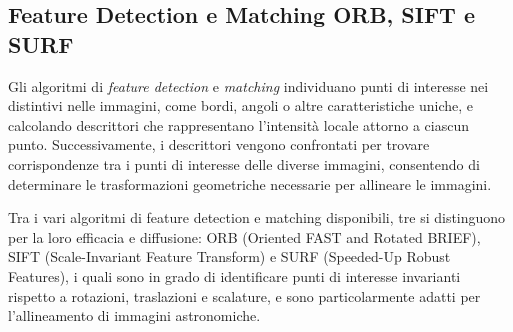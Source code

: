 \subsection{Feature Detection e Matching ORB, SIFT e SURF} \label{subsec:feature_detectoion}

Gli algoritmi di \textit{feature detection} e \textit{matching} individuano punti di interesse nei distintivi nelle immagini, come bordi, angoli o altre caratteristiche uniche, e calcolando descrittori che rappresentano l'intensità locale attorno a ciascun punto. Successivamente, i descrittori vengono confrontati per trovare corrispondenze tra i punti di interesse delle diverse immagini, consentendo di determinare le trasformazioni geometriche necessarie per allineare le immagini.

Tra i vari algoritmi di feature detection e matching disponibili, tre si distinguono per la loro efficacia e diffusione: ORB (Oriented FAST and Rotated BRIEF), SIFT (Scale-Invariant Feature Transform) e SURF (Speeded-Up Robust Features), i quali sono in grado di identificare punti di interesse invarianti rispetto a rotazioni, traslazioni e scalature, e sono particolarmente adatti per l'allineamento di immagini astronomiche.

